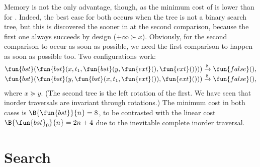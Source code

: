 Memory is not the only advantage, though, as the minimum cost of
 is lower than for
. Indeed, the best case
for both occurs when the tree is not a binary search tree, but this is
discovered the sooner in  at the second comparison, because
the first one always succeeds by design (\(+\infty \succ
x\)). Obviously, for the second comparison to occur as soon as
possible, we need the first comparison to happen as soon as possible
too. Two configurations work:
\begin{align*}
\fun{bst}(\fun{bst}(x,t_1,\fun{bst}(y,\fun{ext}(),\fun{ext}())))
& \xrightarrow{\smash{8}} \fun{false}(),\\
\fun{bst}(\fun{bst}(y,\fun{bst}(x,t_1,\fun{ext}()),\fun{ext}()))
& \xrightarrow{\smash{8}} \fun{false}(),
\end{align*}
where \(x \succcurlyeq y\). (The second tree is the left rotation of
the first. We have seen  that inorder
traversals are invariant through rotations.) The minimum cost in both
cases is \(\B{\fun{bst}}{n} = 8\), to be
contrasted with the linear cost \(\B{\fun{bst}_0}{n} = 2n +
4\) due to the inevitable complete
inorder traversal.

\section{Search}

